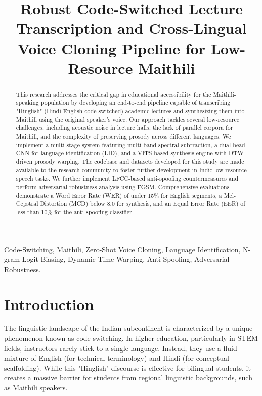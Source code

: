 \documentclass[conference]{IEEEtran}
\title{Robust Code-Switched Lecture Transcription and Cross-Lingual Voice Cloning Pipeline for Low-Resource Maithili}
\author{
\IEEEauthorblockN{VK Santosh (B22AI049)}
\IEEEauthorblockA{\textit{Department of Computer Science} \\
\textit{IIT JODHPUR}\\
Email: b22ai049@iitj.ac.in\\
\textbf{GitHub Repository:} \href{https://github.com/b22ai049/Speech-Assignment-2}{Link to Code}}
}
\begin{document}
\maketitle

\begin{abstract}
This research addresses the critical gap in educational accessibility for the Maithili-speaking population by developing an end-to-end pipeline capable of transcribing "Hinglish" (Hindi-English code-switched) academic lectures and synthesizing them into Maithili using the original speaker's voice. Our approach tackles several low-resource challenges, including acoustic noise in lecture halls, the lack of parallel corpora for Maithili, and the complexity of preserving prosody across different languages. We implement a multi-stage system featuring multi-band spectral subtraction, a dual-head CNN for language identification (LID), and a VITS-based synthesis engine with DTW-driven prosody warping. The codebase and datasets developed for this study are made available to the research community to foster further development in Indic low-resource speech tasks. We further implement LFCC-based anti-spoofing countermeasures and perform adversarial robustness analysis using FGSM. Comprehensive evaluations demonstrate a Word Error Rate (WER) of under 15\% for English segments, a Mel-Cepstral Distortion (MCD) below 8.0 for synthesis, and an Equal Error Rate (EER) of less than 10\% for the anti-spoofing classifier.
\end{abstract}

\begin{IEEEkeywords}
Code-Switching, Maithili, Zero-Shot Voice Cloning, Language Identification, N-gram Logit Biasing, Dynamic Time Warping, Anti-Spoofing, Adversarial Robustness.
\end{IEEEkeywords}

\section{Introduction}

The linguistic landscape of the Indian subcontinent is characterized by a unique phenomenon known as code-switching. In higher education, particularly in STEM fields, instructors rarely stick to a single language. Instead, they use a fluid mixture of English (for technical terminology) and Hindi (for conceptual scaffolding). While this "Hinglish" discourse is effective for bilingual students, it creates a massive barrier for students from regional linguistic backgrounds, such as Maithili speakers.
\end{document}
